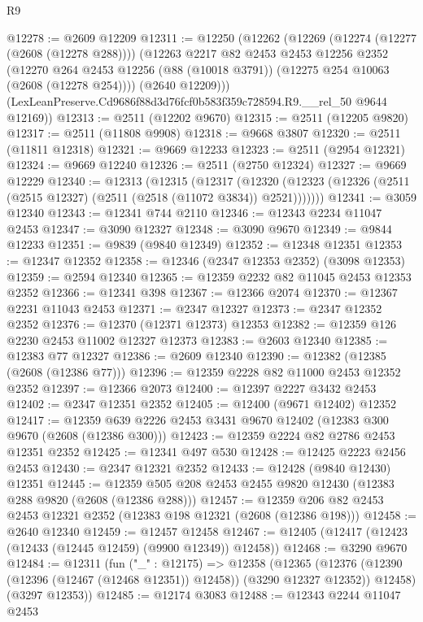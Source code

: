 \begin{lexlean}{R9}
\begin{coremodule}
@12278 := @2609 @12209
@12311 := @12250
    (@12262
      (@12269
        (@12274 (@12277 (@2608 (@12278 @288))))
        (@12263
          @2217
          @82
          @2453
          @2453
          @12256
          @2352
          (@12270 @264 @2453 @12256 (@88 (@10018 @3791)) (@12275 @254 @10063 (@2608 (@12278 @254))))
          (@2640 @12209)))
      (LexLeanPreserve.Cd9686f88d3d76fcf0b583f359c728594.R9.__rel_50 @9644 @12169))
@12313 := @2511 (@12202 @9670)
@12315 := @2511 (@12205 @9820)
@12317 := @2511 (@11808 @9908)
@12318 := @9668 @3807
@12320 := @2511 (@11811 @12318)
@12321 := @9669 @12233
@12323 := @2511 (@2954 @12321)
@12324 := @9669 @12240
@12326 := @2511 (@2750 @12324)
@12327 := @9669 @12229
@12340 := @12313
    (@12315
      (@12317
        (@12320 (@12323 (@12326 (@2511 (@2515 @12327) (@2511 (@2518 (@11072 @3834)) @2521)))))))
@12341 := @3059 @12340
@12343 := @12341 @744 @2110
@12346 := @12343 @2234 @11047 @2453
@12347 := @3090 @12327
@12348 := @3090 @9670
@12349 := @9844 @12233
@12351 := @9839 (@9840 @12349)
@12352 := @12348 @12351
@12353 := @12347 @12352
@12358 := @12346 (@2347 @12353 @2352) (@3098 @12353)
@12359 := @2594 @12340
@12365 := @12359 @2232 @82 @11045 @2453 @12353 @2352
@12366 := @12341 @398
@12367 := @12366 @2074
@12370 := @12367 @2231 @11043 @2453
@12371 := @2347 @12327
@12373 := @2347 @12352 @2352
@12376 := @12370 (@12371 @12373) @12353
@12382 := @12359 @126 @2230 @2453 @11002 @12327 @12373
@12383 := @2603 @12340
@12385 := @12383 @77 @12327
@12386 := @2609 @12340
@12390 := @12382 (@12385 (@2608 (@12386 @77)))
@12396 := @12359 @2228 @82 @11000 @2453 @12352 @2352
@12397 := @12366 @2073
@12400 := @12397 @2227 @3432 @2453
@12402 := @2347 @12351 @2352
@12405 := @12400 (@9671 @12402) @12352
@12417 := @12359 @639 @2226 @2453 @3431 @9670 @12402 (@12383 @300 @9670 (@2608 (@12386 @300)))
@12423 := @12359 @2224 @82 @2786 @2453 @12351 @2352
@12425 := @12341 @497 @530
@12428 := @12425 @2223 @2456 @2453
@12430 := @2347 @12321 @2352
@12433 := @12428 (@9840 @12430) @12351
@12445 := @12359 @505 @208 @2453 @2455 @9820 @12430 (@12383 @288 @9820 (@2608 (@12386 @288)))
@12457 := @12359 @206 @82 @2453 @2453 @12321 @2352 (@12383 @198 @12321 (@2608 (@12386 @198)))
@12458 := @2640 @12340
@12459 := @12457 @12458
@12467 := @12405 (@12417 (@12423 (@12433 (@12445 @12459) (@9900 @12349)) @12458))
@12468 := @3290 @9670
@12484 := @12311
    (fun ("_" : @12175) =>
    @12358
      (@12365
        (@12376 (@12390 (@12396 (@12467 (@12468 @12351)) @12458)) (@3290 @12327 @12352))
        @12458)
      (@3297 @12353))
@12485 := @12174 @3083
@12488 := @12343 @2244 @11047 @2453

\end{coremodule}
\end{lexlean}
